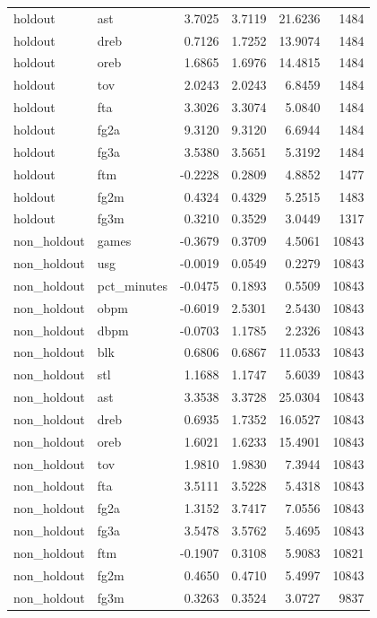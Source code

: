 \begin{table}
\begin{tabular}{llrrrr}
holdout & ast & 3.7025 & 3.7119 & 21.6236 & 1484 \\
holdout & dreb & 0.7126 & 1.7252 & 13.9074 & 1484 \\
holdout & oreb & 1.6865 & 1.6976 & 14.4815 & 1484 \\
holdout & tov & 2.0243 & 2.0243 & 6.8459 & 1484 \\
holdout & fta & 3.3026 & 3.3074 & 5.0840 & 1484 \\
holdout & fg2a & 9.3120 & 9.3120 & 6.6944 & 1484 \\
holdout & fg3a & 3.5380 & 3.5651 & 5.3192 & 1484 \\
holdout & ftm & -0.2228 & 0.2809 & 4.8852 & 1477 \\
holdout & fg2m & 0.4324 & 0.4329 & 5.2515 & 1483 \\
holdout & fg3m & 0.3210 & 0.3529 & 3.0449 & 1317 \\
non\_holdout & games & -0.3679 & 0.3709 & 4.5061 & 10843 \\
non\_holdout & usg & -0.0019 & 0.0549 & 0.2279 & 10843 \\
non\_holdout & pct\_minutes & -0.0475 & 0.1893 & 0.5509 & 10843 \\
non\_holdout & obpm & -0.6019 & 2.5301 & 2.5430 & 10843 \\
non\_holdout & dbpm & -0.0703 & 1.1785 & 2.2326 & 10843 \\
non\_holdout & blk & 0.6806 & 0.6867 & 11.0533 & 10843 \\
non\_holdout & stl & 1.1688 & 1.1747 & 5.6039 & 10843 \\
non\_holdout & ast & 3.3538 & 3.3728 & 25.0304 & 10843 \\
non\_holdout & dreb & 0.6935 & 1.7352 & 16.0527 & 10843 \\
non\_holdout & oreb & 1.6021 & 1.6233 & 15.4901 & 10843 \\
non\_holdout & tov & 1.9810 & 1.9830 & 7.3944 & 10843 \\
non\_holdout & fta & 3.5111 & 3.5228 & 5.4318 & 10843 \\
non\_holdout & fg2a & 1.3152 & 3.7417 & 7.0556 & 10843 \\
non\_holdout & fg3a & 3.5478 & 3.5762 & 5.4695 & 10843 \\
non\_holdout & ftm & -0.1907 & 0.3108 & 5.9083 & 10821 \\
non\_holdout & fg2m & 0.4650 & 0.4710 & 5.4997 & 10843 \\
non\_holdout & fg3m & 0.3263 & 0.3524 & 3.0727 & 9837 \\
\bottomrule
\end{tabular}
\end{table}
